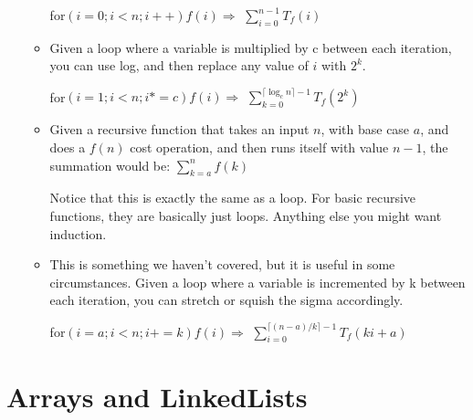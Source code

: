 \documentclass{article}
\begin{document}
\begin{itemize}
\begin{itemize}
    			for$(i = 0; i < n; i++) f(i) \Rightarrow$
    			$\sum_{i=0}^{n-1} T_f(i)$
    		\item
    			Given a loop where a variable is multiplied by c between each iteration, you can use log, and then replace any value of $i$ with $2^k$.
    			
    			for$(i = 1; i < n; i *= c) f(i) \Rightarrow$
    			$\sum_{k=0}^{\lceil \log_c n \rceil - 1} T_f(2^k)$
    		\item
    			Given a recursive function that takes an input $n$, with base case $a$, and does a $f(n)$ cost operation, and then runs itself with value $n-1$, the summation would be:
    			$\sum_{k=a}^{n} f(k)$
    			
    			Notice that this is exactly the same as a loop. For basic recursive functions, they are basically just loops. Anything else you might want induction.
    		\item
    			This is something we haven't covered, but it is useful in some circumstances.
    			Given a loop where a variable is incremented by k between each iteration, you can stretch or squish the sigma accordingly.
    			
    			for$(i = a; i < n; i += k) f(i) \Rightarrow$
    			$\sum_{i=0}^{\lceil(n-a)/k \rceil - 1} T_f(ki + a)$
    	\end{itemize}
\end{itemize}


\section{Arrays and LinkedLists}
\end{document}
